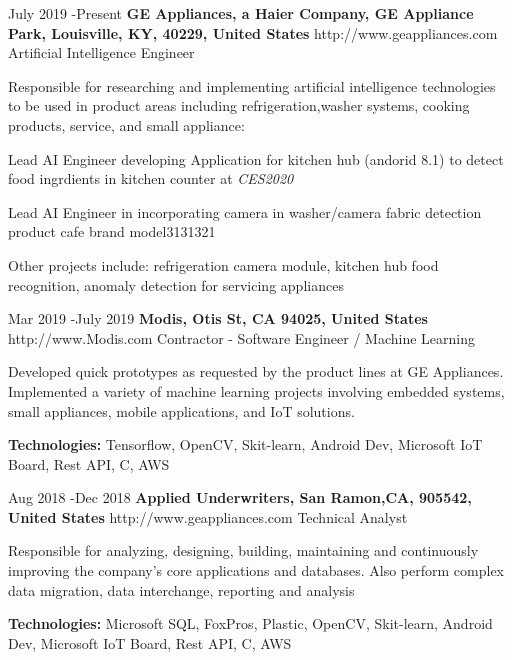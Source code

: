 \documentclass[10pt]{article} %
\begin{document}
\job
{July 2019 -}{Present}
{\bf{GE Appliances, a Haier Company},  \textnormal{GE Appliance Park, Louisville, KY, 40229, United States}}
{http://www.geappliances.com}
{Artificial Intelligence Engineer}
{Responsible for researching and implementing artificial intelligence technologies to be used in product areas including refrigeration,washer systems, cooking products, service, and small appliance:

\begin{itemize-noindent}
\item{Lead AI Engineer developing Application for kitchen hub (andorid 8.1) to detect food ingrdients in kitchen counter at \textit{CES2020}}
\item{Lead AI Engineer in incorporating camera in washer/camera fabric detection product cafe brand model3131321}
\end{itemize-noindent}

Other projects include: refrigeration camera module, kitchen hub food recognition, anomaly detection for servicing appliances}





\job
{Mar 2019 -}{July 2019}
{\bf{Modis}, \textnormal{Otis St, CA 94025, United States}}
{http://www.Modis.com}
{Contractor - Software Engineer / Machine Learning}
{Developed quick prototypes as requested by the product lines at GE Appliances.  Implemented a variety of machine learning projects involving embedded systems, small appliances, mobile applications, and IoT solutions.

\rule{0mm}{5mm}\textbf{Technologies:} Tensorflow, OpenCV, Skit-learn, Android Dev, Microsoft IoT Board, Rest API, C, AWS}



\job
{Aug 2018 -}{Dec 2018}
{\bf{Applied Underwriters},  \textnormal{San Ramon,CA, 905542, United States}}
{http://www.geappliances.com}
{Technical Analyst}
{Responsible for analyzing, designing, building, maintaining and continuously improving the company’s core applications and databases. Also perform complex data migration, data interchange, reporting and analysis

\begin{itemize-noindent}
\item \rule{0mm}{5mm}\textbf{Technologies:} Microsoft SQL, FoxPros, Plastic, OpenCV, Skit-learn, Android Dev, Microsoft IoT Board, Rest API, C, AWS
\end{itemize-noindent}
}
\end{document}

